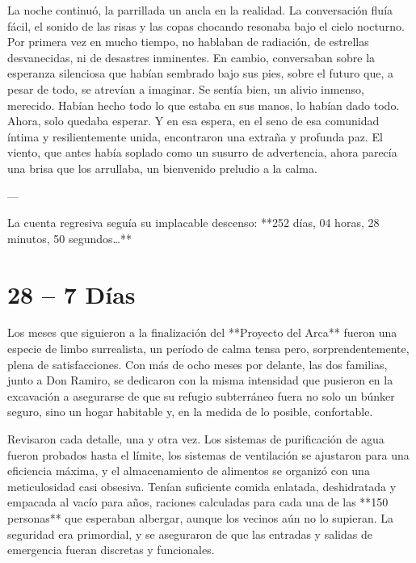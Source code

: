 \documentclass[a4paper,12pt]{book}
\begin{document}
La noche continuó, la parrillada un ancla en la realidad. La conversación fluía fácil, el sonido de las risas y las copas chocando resonaba bajo el cielo nocturno. Por primera vez en mucho tiempo, no hablaban de radiación, de estrellas desvanecidas, ni de desastres inminentes. En cambio, conversaban sobre la esperanza silenciosa que habían sembrado bajo sus pies, sobre el futuro que, a pesar de todo, se atrevían a imaginar. Se sentía bien, un alivio inmenso, merecido. Habían hecho todo lo que estaba en sus manos, lo habían dado todo. Ahora, solo quedaba esperar. Y en esa espera, en el seno de esa comunidad íntima y resilientemente unida, encontraron una extraña y profunda paz. El viento, que antes había soplado como un susurro de advertencia, ahora parecía una brisa que los arrullaba, un bienvenido preludio a la calma.

---

La cuenta regresiva seguía su implacable descenso: **252 días, 04 horas, 28 minutos, 50 segundos…**

\cleardoublepage %

\chapter*{28 – 7 Días}

Los meses que siguieron a la finalización del **Proyecto del Arca** fueron una especie de limbo surrealista, un período de calma tensa pero, sorprendentemente, plena de satisfacciones. Con más de ocho meses por delante, las dos familias, junto a Don Ramiro, se dedicaron con la misma intensidad que pusieron en la excavación a asegurarse de que su refugio subterráneo fuera no solo un búnker seguro, sino un hogar habitable y, en la medida de lo posible, confortable.

Revisaron cada detalle, una y otra vez. Los sistemas de purificación de agua fueron probados hasta el límite, los sistemas de ventilación se ajustaron para una eficiencia máxima, y el almacenamiento de alimentos se organizó con una meticulosidad casi obsesiva. Tenían suficiente comida enlatada, deshidratada y empacada al vacío para años, raciones calculadas para cada una de las **150 personas** que esperaban albergar, aunque los vecinos aún no lo supieran. La seguridad era primordial, y se aseguraron de que las entradas y salidas de emergencia fueran discretas y funcionales.
\end{document}

